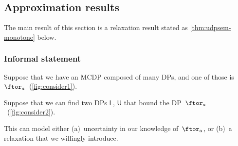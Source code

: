 \subsection{Approximation results\label{sec:Approximation-results}}

The main result of this section is a relaxation result stated as \cref{thm:udpsem-monotone}
below.

\subsubsection*{Informal statement}

Suppose that we have an MCDP composed of many DPs, and one of those
is~$\ftor_{a}$~(\cref{fig:consider1}).


\noindent Suppose that we can find two DPs $\boldsymbol{\mathsf{L}}$,
$\boldsymbol{\mathsf{U}}$ that bound the DP~$\ftor_{a}$~(\cref{fig:consider2}).


\noindent This can model either (a)~uncertainty in our knowledge
of~$\ftor_{a}$, or (b)~a relaxation that we willingly introduce.

